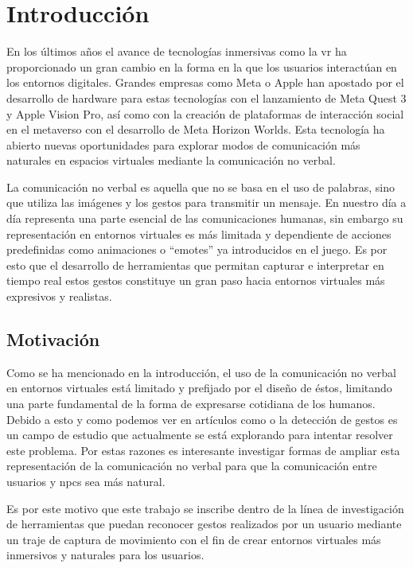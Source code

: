 \chapter{Introducción}
\label{cap:introduccion}


En los últimos años el avance de tecnologías inmersivas como la \gls{vr} ha proporcionado un gran cambio en la forma en la que los usuarios interactúan en los entornos digitales.
Grandes empresas como Meta o Apple han apostado por el desarrollo de hardware para estas tecnologías con el lanzamiento de Meta Quest 3 y Apple Vision Pro, así como con la creación de plataformas de interacción social en el \gls{metaverso} con el desarrollo de Meta Horizon Worlds.
Esta tecnología ha abierto nuevas oportunidades para explorar modos de comunicación más naturales en espacios virtuales mediante la comunicación no verbal.

La comunicación no verbal es aquella que no se basa en el uso de palabras, sino que utiliza las imágenes y los gestos para transmitir un mensaje.
En nuestro día a día representa una parte esencial de las comunicaciones humanas, sin embargo su representación en entornos virtuales es más limitada y dependiente de acciones predefinidas como animaciones o ``emotes'' ya introducidos en el juego.
Es por esto que el desarrollo de herramientas que permitan capturar e interpretar en tiempo real estos gestos constituye un gran paso hacia entornos virtuales más expresivos y realistas.


\section{Motivación}
Como se ha mencionado en la introducción, el uso de la comunicación no verbal en entornos virtuales está limitado y prefijado por el diseño de éstos, limitando una parte fundamental de la forma de expresarse cotidiana de los humanos.
Debido a esto y como podemos ver en artículos como \cite{Neverova} o \cite{VRHANDS} la detección de gestos es un campo de estudio que actualmente se está explorando para intentar resolver este problema.
Por estas razones es interesante investigar formas de ampliar esta representación de la comunicación no verbal para que la comunicación entre usuarios y \glspl{npc} sea más natural.

Es por este motivo que este trabajo se inscribe dentro de la línea de investigación de herramientas que puedan reconocer gestos realizados por un usuario mediante un traje de captura de movimiento con el fin de crear entornos virtuales más inmersivos y naturales para los usuarios.

